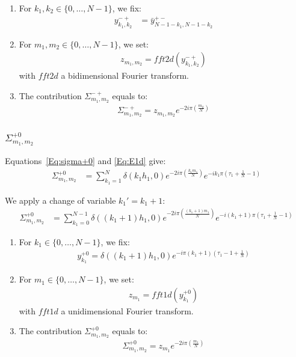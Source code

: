 \begin{enumerate}
\item For $k_1,k_2\in\{0,\hdots,N-1\}$, we fix:
\begin{align*}
y^{-+}_{k_1,k_2}&=\bar{y}^{+-}_{N-1-k_1,N-1-k_2}
\end{align*}
\item For $m_1,m_2\in\{0,\hdots,N-1\}$, we set:
\begin{align*}
  z_{m_1,m_2}=fft2d(y^{-+}_{k_1,k_2})
\end{align*}
with $fft2d$ a bidimensional Fourier transform.
\item The contribution $\Sigma_{m_1,m_2}^{-+}$ equals to:
\begin{align*}
  \Sigma_{m_1,m_2}^{-+}=z_{m_1,m_2} e^{-2i\pi\left(\frac{m_2}{N}\right)}
\end{align*}
\end{enumerate}


\subsubsection{\texorpdfstring{$\Sigma_{m_1,m_2}^{+0}$}{sigma+0}}
Equations~\eqref{Eq:sigma+0} and \eqref{Eq:E1d} give:
\begin{align*}
\Sigma_{m_1,m_2}^{+0}&=\sum_{k_1=1}^{N}\delta\left(k_1h_1,0\right)
    e^{-2i\pi\left(\frac{k_1m_1}{N}\right)}
    e^{-ik_1\pi\left(\tau_1+\frac{1}{N}-1\right)}
\end{align*}

We apply a change of variable $k_1'=k_1+1$:
\begin{align*}
\Sigma_{m_1,m_2}^{+0}&=\sum_{k_1=0}^{N-1}
  \delta\left((k_1+1)h_1,0\right) e^{-2i\pi\left(\frac{(k_1+1)m_1}{N}\right)}
    e^{-i(k_1+1)\pi\left(\tau_1+\frac{1}{N}-1\right)}
\end{align*}

\begin{enumerate}
\item For $k_1\in\{0,\hdots,N-1\}$, we fix:
\begin{align*}
y^{+0}_{k_1}= \delta((k_1+1)h_1,0)e^{-i\pi (k_1+1)\left(\tau_1-1+\frac{1}{N}\right)}
\end{align*}
\item For $m_1\in\{0,\hdots,N-1\}$, we set:
\begin{align*}
  z_{m_1}=fft1d(y^{+0}_{k_1})
\end{align*}
with $fft1d$ a unidimensional Fourier transform.
\item The contribution $\Sigma_{m_1,m_2}^{+0}$ equals to:
\begin{align*}
  \Sigma_{m_1,m_2}^{+0}=z_{m_1} e^{-2i\pi\left(\frac{m_1}{N}\right)}
\end{align*}
\end{enumerate}

